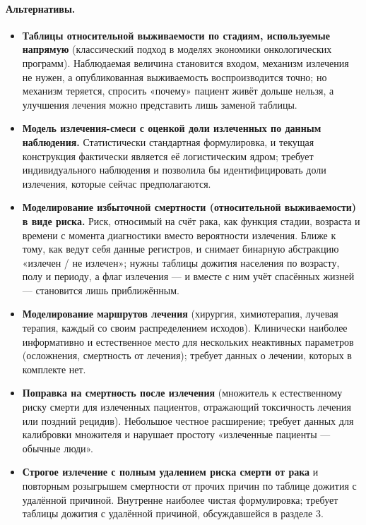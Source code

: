 \documentclass[12pt,a4paper]{article}
\newcommand{\alt}[1]{\paragraph{Альтернативы.} #1}
\begin{document}
\alt{\begin{itemize}[nosep]
  \item \textbf{Таблицы относительной выживаемости по стадиям, используемые напрямую} (классический подход в
        моделях экономики онкологических программ). Наблюдаемая величина становится входом, механизм
        излечения не нужен, а опубликованная выживаемость воспроизводится точно; но механизм теряется,
        спросить «почему» пациент живёт дольше нельзя, а улучшения лечения можно представить лишь заменой
        таблицы.
  \item \textbf{Модель излечения-смеси с оценкой доли излеченных по данным наблюдения.} Статистически
        стандартная формулировка, и текущая конструкция фактически является её логистическим ядром; требует
        индивидуального наблюдения и позволила бы идентифицировать доли излечения, которые сейчас
        предполагаются.
  \item \textbf{Моделирование избыточной смертности (относительной выживаемости) в виде риска.} Риск,
        относимый на счёт рака, как функция стадии, возраста и времени с момента диагностики вместо
        вероятности излечения. Ближе к тому, как ведут себя данные регистров, и снимает бинарную абстракцию
        «излечен / не излечен»; нужны таблицы дожития населения по возрасту, полу и периоду, а флаг излечения
        --- и вместе с ним учёт спасённых жизней --- становится лишь приближённым.
  \item \textbf{Моделирование маршрутов лечения} (хирургия, химиотерапия, лучевая терапия, каждый со своим
        распределением исходов). Клинически наиболее информативно и естественное место для нескольких
        неактивных параметров (осложнения, смертность от лечения); требует данных о лечении, которых в
        комплекте нет.
  \item \textbf{Поправка на смертность после излечения} (множитель к естественному риску смерти для
        излеченных пациентов, отражающий токсичность лечения или поздний рецидив). Небольшое честное
        расширение; требует данных для калибровки множителя и нарушает простоту «излеченные пациенты ---
        обычные люди».
  \item \textbf{Строгое излечение с полным удалением риска смерти от рака} и повторным розыгрышем смертности
        от прочих причин по таблице дожития с удалённой причиной. Внутренне наиболее чистая формулировка;
        требует таблицы дожития с удалённой причиной, обсуждавшейся в разделе 3.
\end{itemize}}
\end{document}

